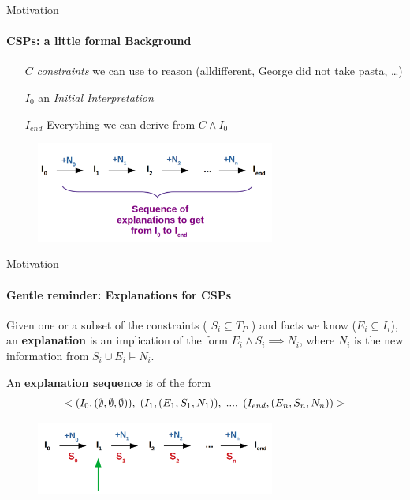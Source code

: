 \documentclass[handout]{beamer}
\newcommand\m[1]{\ensuremath{#1}\xspace}
\begin{document}
	\begin{frame}{Motivation}
		\framesubtitle{CSPs: a little formal Background}
		
		\begin{itemize}
			\item[$\m{C}$] \emph{constraints} we can use to reason (alldifferent, George did not take pasta, …)
			\item[$I_0$] an \emph{Initial Interpretation}
			\item[$I_{end}$] Everything we can derive from $ \m{C} \wedge \m{I}_0$
		\end{itemize}
		\begin{figure}
			\includegraphics[width=0.7\textwidth]{sequence_explanation.png}
		\end{figure}
	\end{frame}
	
	
	
	\begin{frame}{Motivation}
		\framesubtitle{Gentle reminder: Explanations for CSPs}
		\begin{definition}
			Given one or a subset of the constraints ( $S_i \subseteq T_P$  ) and facts we know ($E_i\subseteq I_i$), an \textbf{explanation} is an implication of the form $E_i \wedge S_i  \implies N_i $, where $N_i$ is the new information from $S_i \cup E_i \models N_i$.
		\end{definition}
		
		An \textbf{explanation sequence} is of the form $$<(I_0,(\emptyset,\emptyset,\emptyset)),\text{\hspace{3pt}}(I_1,(E_1, S_1, N_1)),\text{\hspace{3pt}}...,\text{\hspace{3pt}}(I_{end},(E_{n}, S_n, N_n ))>$$
		
		\begin{figure}
			\includegraphics[width=0.7\textwidth]{sequence_explanation2.png}
		\end{figure}
		
		
	\end{frame}
	
\end{document}
